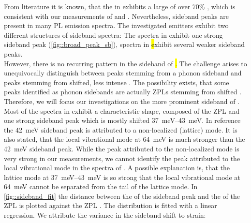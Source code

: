 		From literature it is known, that the \siv in \nd exhibits a large \db of over 70\% \cite{Neu2011,Neu2011b}, which is consistent with our measurements of \emnarrow and \embroad.
		Nevertheless, sideband peaks are present in many \siv PL emission spectra.
		The investigated emitters exhibit two different structures of sideband spectra: The spectra in \vl exhibit one strong sideband peak (\autoref{fig::broad_peak_sb}), spectra in \hl exhibit several weaker sideband peaks.
		\\
		However, there is no recurring pattern in the sideband of \hl.
		The challenge arises to unequivocally distinguish between peaks stemming from a phonon sideband and peaks stemming from shifted, less intense \siv \ZPLs.
		The possibility exists, that some peaks identified as phonon sidebands are actually ZPLs stemming from shifted \sivs. 
		Therefore, we will focus our investigations on the more prominent sideband of \vl.
		\\
		Most of the spectra in \vl exhibit a characteristic shape, composed of the ZPL and one strong sideband peak which is mostly shifted \SIrange{37}{43}{meV}. 
		In reference \cite{Dietrich2014} the \SI{42}{meV} sideband peak is attributed to a non-localized (lattice) mode. 
		It is also stated, that the local vibrational mode at \SI{64}{meV} is much stronger than the  \SI{42}{meV} sideband peak. 
		While the peak attributed to the non-localized mode is very strong in our measurements, we cannot identify the peak attributed to the local vibrational \siv mode in the spectra of \vl. 
		A possible explanation is, that the lattice mode at \SIrange{37}{43}{meV} is so strong that the local vibrational mode at \SI{64}{meV} cannot be separated from the tail of the lattice mode.
		In \autoref{fig::sideband_fit} the distance between the \cwl of the sideband peak and the \cwl of the ZPL is plotted against the ZPL \cwl. 
		The distribution is fitted with a linear regression.
		We attribute the variance in the sideband shift to strain: 
		\\
		